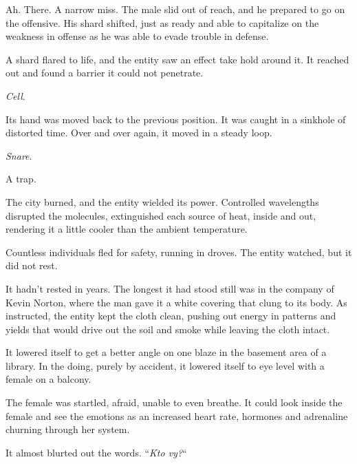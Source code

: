 Ah.  There.  A narrow miss.  The male slid out of reach, and he prepared to go on the offensive.  His shard shifted, just as ready and able to capitalize on the weakness in offense as he was able to evade trouble in defense.



A shard flared to life, and the entity saw an effect take hold around it.  It reached out and found a barrier it could not penetrate.



\emph{Cell}.



Its hand was moved back to the previous position.  It was caught in a sinkhole of distorted time.  Over and over again, it moved in a steady loop.



\emph{Snare}.



A trap.



\blacksquare



The city burned, and the entity wielded its power.  Controlled wavelengths disrupted the molecules, extinguished each source of heat, inside and out, rendering it a little cooler than the ambient temperature.



Countless individuals fled for safety, running in droves.  The entity watched, but it did not rest.



It hadn't rested in years.  The longest it had stood still was in the company of Kevin Norton, where the man gave it a white covering that clung to its body.  As instructed, the entity kept the cloth clean, pushing out energy in patterns and yields that would drive out the soil and smoke while leaving the cloth intact.



It lowered itself to get a better angle on one blaze in the basement area of a library.  In the doing, purely by accident, it lowered itself to eye level with a female on a balcony.



The female was startled, afraid, unable to even breathe.  It could look inside the female and see the emotions as an increased heart rate, hormones and adrenaline churning through her system.



It almost blurted out the words.  ``\emph{Kto vy?}``



